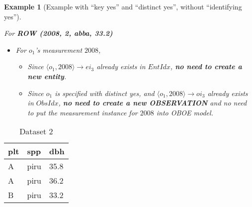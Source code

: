 \documentclass[10pt]{article}
\newtheorem{example}{Example}[section]
\begin{document}
\begin{example} [Example with ``key yes'' and ``distinct yes'', without ``identifying yes'']
\begin{itemize}
\begin{itemize}
        \end{itemize}
    \end{itemize}
For {\bf ROW (2008, 2, abba, 33.2)}
    \begin{itemize}
        \item For $o_1$'s measurement $2008$, 
	\begin{itemize}
	\item Since $\langle o_1, 2008 \rangle \rightarrow ei_3$ already exists in $EntIdx$, {\bf no need to create a new entity}.
        \item Since $o_1$ is specified with {\em distinct yes}, and $\langle o_1, 2008 \rangle \rightarrow oi_3 $ already exists in $ObsIdx$, 
	{\bf no need to create a new OBSERVATION} and no need to put the measurement instance for $2008$ into OBOE model.
	\end{itemize}
    \end{itemize}

\end{example}
 
    
\begin{table}[htb]
\begin{center}
\begin{tabular}{|l|l|l|}
\hline
plt & spp & dbh\\\hline
A & piru & 35.8 \\\hline
A & piru & 36.2 \\\hline
B & piru &33.2 \\\hline
\end{tabular}
\end{center}
\vspace{-0.2in}
\caption{Dataset 2}
\label{tb2}
\end{table}
\end{document}
